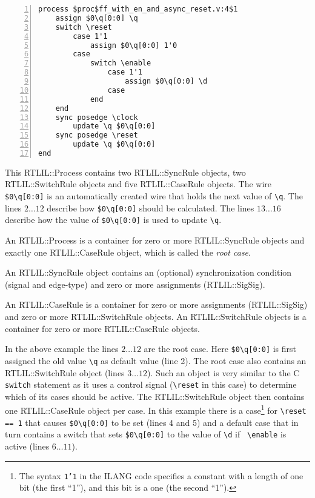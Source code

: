 \begin{lstlisting}[numbers=left,frame=single,language=rtlil]
process $proc$ff_with_en_and_async_reset.v:4$1
	assign $0\q[0:0] \q
	switch \reset
		case 1'1
			assign $0\q[0:0] 1'0
		case 
			switch \enable
				case 1'1
					assign $0\q[0:0] \d
				case 
			end
	end
	sync posedge \clock
		update \q $0\q[0:0]
	sync posedge \reset
		update \q $0\q[0:0]
end
\end{lstlisting}

This RTLIL::Process contains two RTLIL::SyncRule objects, two RTLIL::SwitchRule
objects and five RTLIL::CaseRule objects. The wire {\tt \$0\textbackslash{}q[0:0]}
is an automatically created wire that holds the next value of {\tt \textbackslash{}q}. The lines
$2 \dots 12$ describe how {\tt \$0\textbackslash{}q[0:0]} should be calculated. The
lines $13 \dots 16$ describe how the value of {\tt \$0\textbackslash{}q[0:0]} is used
to update {\tt \textbackslash{}q}.

An RTLIL::Process is a container for zero or more RTLIL::SyncRule objects and
exactly one RTLIL::CaseRule object, which is called the {\it root case}.

An RTLIL::SyncRule object contains an (optional) synchronization condition
(signal and edge-type) and zero or more assignments (RTLIL::SigSig).

An RTLIL::CaseRule is a container for zero or more assignments (RTLIL::SigSig)
and zero or more RTLIL::SwitchRule objects. An RTLIL::SwitchRule objects is a
container for zero or more RTLIL::CaseRule objects.

In the above example the lines $2 \dots 12$ are the root case. Here {\tt \$0\textbackslash{}q[0:0]} is first 
assigned the old value {\tt \textbackslash{}q} as default value (line 2). The root case
also contains an RTLIL::SwitchRule object (lines $3 \dots 12$). Such an object is very similar to the C {\tt switch}
statement as it uses a control signal ({\tt \textbackslash{}reset} in this case) to determine
which of its cases should be active. The RTLIL::SwitchRule object then contains one RTLIL::CaseRule
object per case. In this example there is a case\footnote{The
syntax {\tt 1'1} in the ILANG code specifies a constant with a length of one bit (the first ``1''),
and this bit is a one (the second ``1'').} for {\tt \textbackslash{}reset == 1} that causes
{\tt \$0\textbackslash{}q[0:0]} to be set (lines 4 and 5) and a default case that in turn contains a switch that
sets {\tt \$0\textbackslash{}q[0:0]} to the value of {\tt \textbackslash{}d} if {\tt
\textbackslash{}enable} is active (lines $6 \dots 11$).

